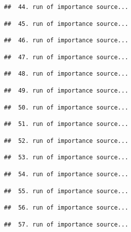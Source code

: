 \documentclass[
]{article}
\begin{document}
\begin{verbatim}
##  44. run of importance source...
\end{verbatim}

\begin{verbatim}
##  45. run of importance source...
\end{verbatim}

\begin{verbatim}
##  46. run of importance source...
\end{verbatim}

\begin{verbatim}
##  47. run of importance source...
\end{verbatim}

\begin{verbatim}
##  48. run of importance source...
\end{verbatim}

\begin{verbatim}
##  49. run of importance source...
\end{verbatim}

\begin{verbatim}
##  50. run of importance source...
\end{verbatim}

\begin{verbatim}
##  51. run of importance source...
\end{verbatim}

\begin{verbatim}
##  52. run of importance source...
\end{verbatim}

\begin{verbatim}
##  53. run of importance source...
\end{verbatim}

\begin{verbatim}
##  54. run of importance source...
\end{verbatim}

\begin{verbatim}
##  55. run of importance source...
\end{verbatim}

\begin{verbatim}
##  56. run of importance source...
\end{verbatim}

\begin{verbatim}
##  57. run of importance source...
\end{verbatim}
\end{document}

